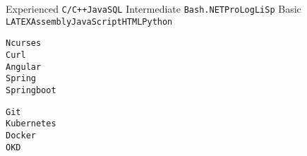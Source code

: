 \documentclass[9pt]{developercv} %
\begin{document}
\vspace{0.5cm}


\begin{minipage}[t]{0.3\textwidth}
	\vspace{-\baselineskip} %

	\begin{entrylist}
	\entry
		{Experienced}
		{}
		{}
		{\texttt{C/C++}\slashsep\texttt{Java}\slashsep\texttt{SQL}}
	\entry
		{Intermediate}
		{}
		{}
		{\texttt{Bash}\slashsep\texttt{.NET}\slashsep\texttt{ProLog}\slashsep\texttt{LiSp}}
	\entry
		{Basic}
		{}
		{}
		{\texttt{LATEX}\slashsep\texttt{Assembly}\slashsep\texttt{JavaScript}\slashsep\texttt{HTML}\slashsep\texttt{Python}}
	\end{entrylist}
\end{minipage}
\hfill
\begin{minipage}[t]{0.3\textwidth}
	\vspace{-\baselineskip} %
	
	
	{\texttt{Ncurses}\\\texttt{Curl}\\\texttt{Angular}\\\texttt{Spring}\\\texttt{Springboot}}
\end{minipage}
\hfill
\begin{minipage}[t]{0.3\textwidth}
	\vspace{-\baselineskip} %
	
	
	{\texttt{Git}\\\texttt{Kubernetes}\\\texttt{Docker}\\\texttt{OKD}}
\end{minipage}


\end{document}

